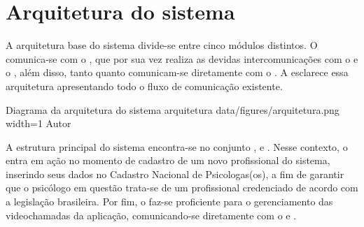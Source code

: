 \section{Arquitetura do sistema}
\label{sec:arquitetura}

A arquitetura base do sistema divide-se entre cinco módulos distintos. O  comunica-se com o , que por sua vez realiza as devidas intercomunicações com o  e o , além disso, tanto  quanto  comunicam-se diretamente com o . A  esclarece essa arquitetura apresentando todo o fluxo de comunicação existente.

\image
    {Diagrama da arquitetura do sistema}
    {arquitetura}
    {data/figures/arquitetura.png}
    {width=1\textwidth}
    {Autor}

A estrutura principal do sistema encontra-se no conjunto ,  e . Nesse contexto, o  entra em ação no momento de cadastro de um novo profissional do sistema, inserindo seus dados no Cadastro Nacional de Psicologas(os), a fim de garantir que o psicólogo em questão trata-se de um profissional credenciado de acordo com a legislação brasileira. Por fim, o  faz-se proficiente para o gerenciamento das videochamadas da aplicação, comunicando-se diretamente com o  e .
